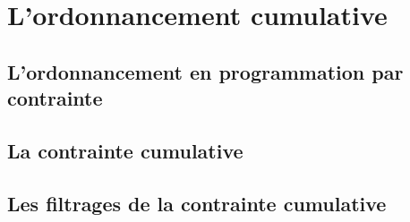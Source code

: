 \section{L'ordonnancement cumulative}
\label{sec:cumu}
\subsection{L'ordonnancement en programmation par contrainte}
\label{sec:cumu_ordo}

\subsection{La contrainte cumulative}
\label{sec:cumu_cume}

\subsection{Les filtrages de la contrainte cumulative}
\label{sec:cumu_propag}


